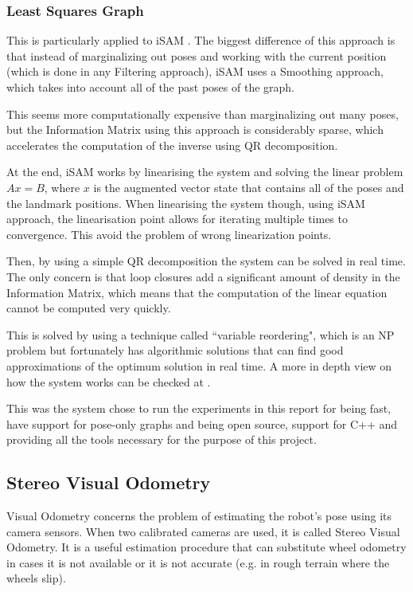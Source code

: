\documentclass[11pt]{article}
\begin{document}
	\subsubsection{Least Squares Graph}
This is particularly applied to iSAM \cite{Kaess08tro}. The biggest difference of this approach is that instead of marginalizing out poses and working with the current position (which is done in any Filtering approach), iSAM uses a Smoothing approach, which takes into account all of the past poses of the graph.

This seems more computationally expensive than marginalizing out many poses, but the Information Matrix using this approach is considerably sparse, which accelerates the computation of the inverse using QR decomposition.

At the end, iSAM works by linearising the system and solving the linear problem $Ax = B$, where $x$ is the augmented vector state that contains all of the poses and the landmark positions. When linearising the system though, using iSAM approach, the linearisation point allows for iterating multiple times to convergence. This avoid the problem of wrong linearization points.

Then, by using a simple QR decomposition the system can be solved in real time. The only concern is that loop closures add a significant amount of density in the Information Matrix, which means that the computation of the linear equation cannot be computed very quickly.

This is solved by using a technique called ``variable reordering", which is an NP problem but fortunately has algorithmic solutions that can find good approximations of the optimum solution in real time. A more in depth view on how the system works can be checked at \cite{Kaess08tro}.

This was the system chose to run the experiments in this report for being fast, have support for pose-only graphs and being open source, support for C++ and providing all the tools necessary for the purpose of this project.

	
	\subsection{Stereo Visual Odometry}
	\label{subs:SVO}

Visual Odometry concerns the problem of estimating the robot's pose using its camera sensors. When two calibrated cameras are used, it is called Stereo Visual Odometry. It is a useful estimation procedure that can substitute wheel odometry in cases it is not available or it is not accurate (e.g. in rough terrain where the wheels slip).
	
\end{document}

